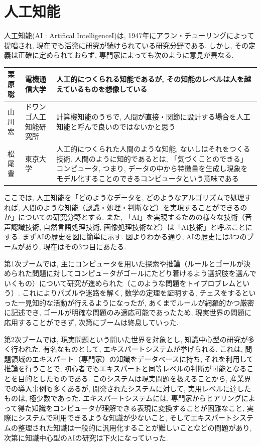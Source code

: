 \documentclass{suribt}
\begin{document}
\section{人工知能}
人工知能(AI : Artifical IntelligenceI)は, 1947年にアラン・チューリングによって提唱され, 現在でも活発に研究が続けられている研究分野である. しかし, その定義は正確に定められておらず, 専門家によっても次のように意見が異なる.
\begin{table}[htb]
	\begin{tabular}{l|l|p{7cm}}
		\hline
		栗原聡 & 電機通信大学 & 人工的につくられる知能であるが, その知能のレベルは人を越えているものを想像している \\ \hline
		山川宏 & ドワンゴ人工知能研究所 & 計算機知能のうちで, 人間が直接・関節に設計する場合を人工知能と呼んで良いのではないかと思う \\ \hline
		松尾豊 & 東京大学 & 人工的につくられた人間のような知能, ないしはそれをつくる技術. 人間のように知的であるとは, 「気づくことのできる」コンピュータ, つまり, データの中から特徴量を生成し現象をモデル化することのできるコンピュータという意味である \\
		\hline
	\end{tabular}
\end{table}

ここでは, 人工知能を「どのようなデータを, どのようなアルゴリズムで処理すれば, 人間のような知能（認識・処理・判断など）を実現することができるのか」についての研究分野とする. また, 「AI」を実現するための様々な技術（音声認識技術, 自然言語処理技術, 画像処理技術など）は「AI技術」と呼ぶことにする.
まずAIの歴史を図に簡単に示す. 図よりわかる通り, AIの歴史には3つのブームがあり, 現在はその3つ目にあたる. 

第1次ブームでは, 主にコンピュータを用いた探索や推論（ルールとゴールが決められた問題に対してコンピュータがゴールにたどり着けるよう選択肢を選んでいくもの）について研究が進められた（このような問題をトイプロブレムという）. これによりパズルや迷路を解く, 数学の定理を証明する, チェスをするといった一見知的な活動が行えるようになったが, あくまでルールが網羅的かつ厳密に記述でき, ゴールが明確な問題のみ適応可能であったため, 現実世界の問題に応用することができず, 次第にブームは終息していった.

第2次ブームでは, 現実問題という開いた世界を対象とし, 知識中心型の研究が多く行われた. 有名なものとして, エキスパートシステムが挙げられる. これは, 問題領域のエキスパート（専門家）の知識をデータベースに持ち, それを利用して推論を行うことで, 初心者でもエキスパートと同等レベルの判断が可能となることを目的としたものである. このシステムは現実問題を扱えることから, 産業界での導入事例も多くあるが, 開発されたシステムに対して, 実用レベルに達したものは, 極少数であった\cite{Terano-2003}. エキスパートシステムには, 専門家からヒアリングによって得た知識をコンピュータが理解できる表現に変換することが困難なこと, 実際にシステムで利用できるような知識が少ないこと, そしてエキスパートシステムの整理された知識は一般的に汎用化することが難しいことなどの問題\cite{Terano-2003, Suwa-1986}があり, 次第に知識中心型のAIの研究は下火になっていった. 
\end{document}
